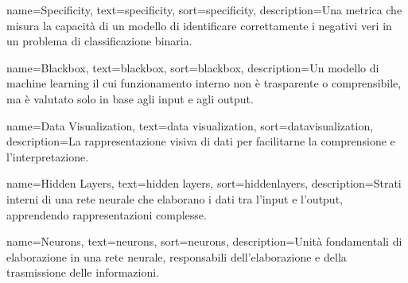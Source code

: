  {
    name={Specificity},
    text={specificity},
    sort={specificity},
    description={Una metrica che misura la capacità di un modello di identificare correttamente i negativi veri in un problema di classificazione binaria.}
}

 {
    name={Blackbox},
    text={blackbox},
    sort={blackbox},
    description={Un modello di machine learning il cui funzionamento interno non è trasparente o comprensibile, ma è valutato solo in base agli input e agli output.}
}

 {
    name={Data Visualization},
    text={data visualization},
    sort={datavisualization},
    description={La rappresentazione visiva di dati per facilitarne la comprensione e l'interpretazione.}
}

 {
    name={Hidden Layers},
    text={hidden layers},
    sort={hiddenlayers},
    description={Strati interni di una rete neurale che elaborano i dati tra l'input e l'output, apprendendo rappresentazioni complesse.}
}

 {
    name={Neurons},
    text={neurons},
    sort={neurons},
    description={Unità fondamentali di elaborazione in una rete neurale, responsabili dell'elaborazione e della trasmissione delle informazioni.}
}
